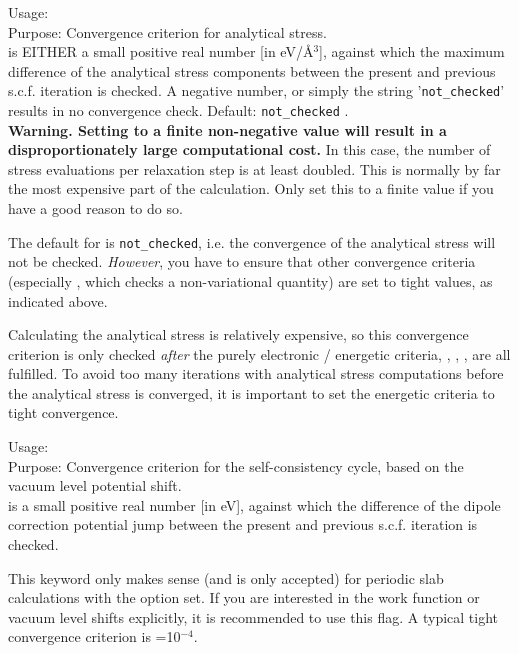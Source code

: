 {
  \noindent
  Usage:   \\[1.0ex]
  Purpose: Convergence criterion for analytical stress. \\[1.0ex]
   is EITHER a small positive real number [in
    eV/{\AA$^3$}], against which the maximum difference of the
  analytical stress components between the present and previous
  s.c.f. iteration is checked. A negative number, or simply the string
  '\texttt{not\_checked}' results in no convergence check. Default:
  \texttt{not\_checked} .\\  
}
\textbf{Warning. Setting  to a finite
  non-negative value will result in a disproportionately large
  computational cost.} In this case, the number of stress evaluations
  per relaxation step is at least doubled. This is normally by far the
  most expensive part of the calculation. Only set this to a finite
  value if you have a good reason to do so.

The default for  is \texttt{not\_checked}, i.e. the convergence of
the analytical stress will not be checked. \emph{However}, you have to ensure
that other convergence criteria (especially ,
which checks a non-variational quantity) are set to tight values, as
indicated above.

Calculating the analytical stress is relatively expensive, so this convergence
criterion is only checked \emph{after} the purely electronic / energetic
criteria, , ,
, are all fulfilled. To avoid too many iterations
with analytical stress computations before the analytical stress is converged,
it is important to set the energetic criteria to tight convergence.

{
  \noindent
  Usage:   \\[1.0ex]
  Purpose: Convergence criterion for the self-consistency cycle, based
    on the vacuum level potential shift. \\[1.0ex]
   is a small positive real number [in eV], against
  which the difference of the dipole correction potential jump between the present and
  previous s.c.f. iteration is checked. \\
}

This keyword only makes sense (and is only accepted) for periodic slab calculations
with the option  set. If you are interested in the work function or
vacuum level shifts explicitly, it is recommended to use this flag. A typical tight convergence 
criterion is =10$^{-4}$.


